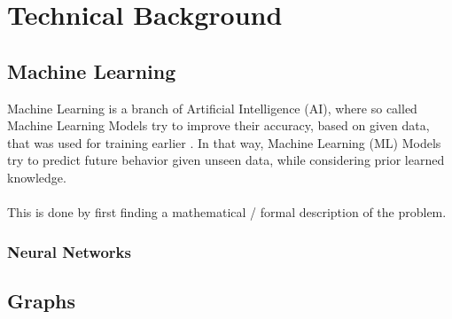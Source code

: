 
\chapter{Technical Background}
	
	\section{Machine Learning}
	
	\justifying \noindent
	Machine Learning is a branch of Artificial Intelligence (AI), where so called Machine Learning Models try to improve their accuracy, based on given data, that was used for training earlier \cite{simeone2018brief}. In that way, Machine Learning (ML) Models try to predict future behavior given unseen data, while considering prior learned knowledge.
	\\\\
	This is done by first finding a mathematical / formal description of the problem. \cite{ProvaUserManual}
	
	\subsection{Neural Networks}
	
	\section{Graphs}
		